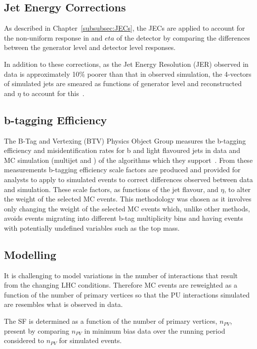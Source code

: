 \subsection{Jet Energy Corrections}\label{subsec:jesjer}
As described in Chapter~\ref{subsubsec:JECs}, the JECs are applied to account for the non-uniform response in \pT and $eta$ of the detector by comparing the differences between the generator level and detector level responses.

In addition to these corrections, as the Jet Energy Resolution (JER) observed in data is approximately 10\% poorer than that in observed simulation, the 4-vectors of simulated jets are smeared as functions of generator level and reconstructed \pt and $\eta$ to account for this~\cite{Khachatryan:2016kdb}.

\subsection{b-tagging Efficiency}\label{subsec:btagEff}
The B-Tag and Vertexing (BTV) Physics Object Group measures the b-tagging efficiency and misidentification rates for b and light flavoured jets in data and MC simulation (multijet and \ttbar) of the algorithms which they support~\cite{Sirunyan:2017ezt}.
From these measurements b-tagging efficiency scale factors are produced and provided for analysts to apply to simulated events to correct differences observed between data and simulation.
These scale factors, as functions of the jet flavour, \pT and $\eta$, to alter the weight of the selected MC events.
This methodology was chosen as it involves only changing the weight of the selected MC events which, unlike other methods, avoids events migrating into different b-tag multiplicity bins and having events with potentially undefined variables such as the top mass.

\subsection{\PU Modelling}\label{subsec:puSF}
It is challenging to model variations in the number of \PU interactions that result from the changing LHC conditions.
Therefore MC events are reweighted as a function of the number of primary vertices so that the PU interactions simulated are resembles what is observed in data.

The \PU SF is determined as a function of the number of primary vertices, $n_{PV}$, present by comparing $n_{PV}$ in minimum bias data over the running period considered to $n_{PV}$ for simulated events.

